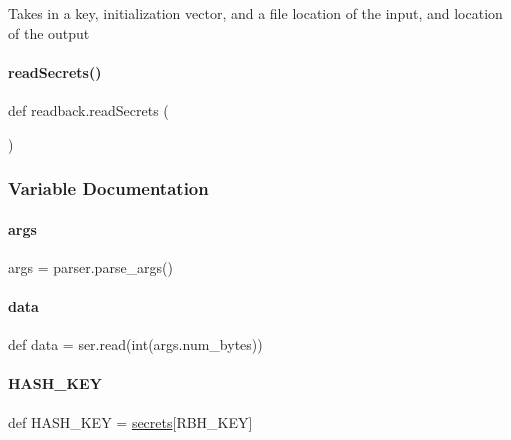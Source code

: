 \begin{DoxyVerb}Takes in a key, initialization vector, and a file location of the     input, and location of the output\end{DoxyVerb}
 \mbox{\label{namespacereadback_a7e694d4aa4ee2fc3c68862d4c30379e5}} 
\paragraph{\texorpdfstring{read\+Secrets()}{readSecrets()}}
{\footnotesize\ttfamily def readback.\+read\+Secrets (\begin{DoxyParamCaption}{ }\end{DoxyParamCaption})}



\subsubsection{Variable Documentation}
\mbox{\label{namespacereadback_a8187411843a6284ffb964ef3fb9fcab3}} 
\paragraph{\texorpdfstring{args}{args}}
{\footnotesize\ttfamily args = parser.\+parse\+\_\+args()}

\mbox{\label{namespacereadback_a8d6c5236d106a59c389eaa162449dfdd}} 
\paragraph{\texorpdfstring{data}{data}}
{\footnotesize\ttfamily def data = ser.\+read(int(args.\+num\+\_\+bytes))}

\mbox{\label{namespacereadback_a35a9a34ee7518a921d8160de0d047582}} 
\paragraph{\texorpdfstring{H\+A\+S\+H\+\_\+\+K\+EY}{HASH\_KEY}}
{\footnotesize\ttfamily def H\+A\+S\+H\+\_\+\+K\+EY = \hyperlink{namespacereadback_a7ef58b6350bb8f1ea4b81d24cac72a55}{secrets}\mbox{[}\textquotesingle{}R\+B\+H\+\_\+\+K\+EY\textquotesingle{}\mbox{]}}

